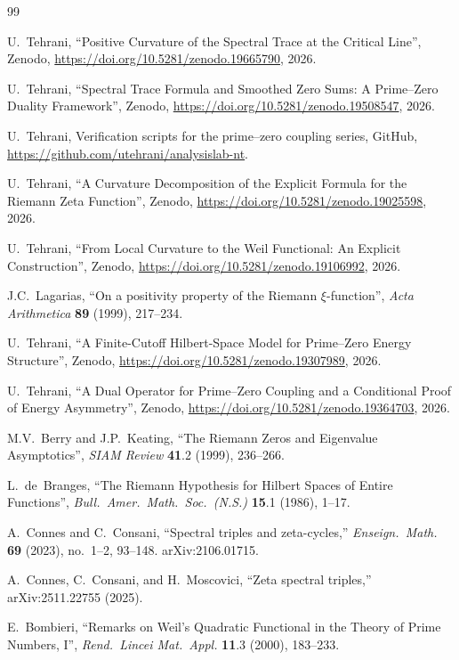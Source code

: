 \documentclass[11pt]{article}
\begin{document}
\newpage
\begin{thebibliography}{99}

U.~Tehrani,
``Positive Curvature of the Spectral Trace at the Critical Line'',
Zenodo, \url{https://doi.org/10.5281/zenodo.19665790}, 2026.

U.~Tehrani,
``Spectral Trace Formula and Smoothed Zero Sums:
A Prime--Zero Duality Framework'',
Zenodo, \url{https://doi.org/10.5281/zenodo.19508547}, 2026.

U.~Tehrani,
Verification scripts for the prime--zero coupling series,
GitHub, \url{https://github.com/utehrani/analysislab-nt}.

U.~Tehrani,
``A Curvature Decomposition of the Explicit Formula
for the Riemann Zeta Function'',
Zenodo, \url{https://doi.org/10.5281/zenodo.19025598}, 2026.

U.~Tehrani,
``From Local Curvature to the Weil Functional:
An Explicit Construction'',
Zenodo, \url{https://doi.org/10.5281/zenodo.19106992}, 2026.

J.C.~Lagarias,
``On a positivity property of the Riemann $\xi$-function'',
\emph{Acta Arithmetica} \textbf{89} (1999), 217--234.

U.~Tehrani,
``A Finite-Cutoff Hilbert-Space Model for Prime--Zero Energy Structure'',
Zenodo, \url{https://doi.org/10.5281/zenodo.19307989}, 2026.

U.~Tehrani,
``A Dual Operator for Prime--Zero Coupling
and a Conditional Proof of Energy Asymmetry'',
Zenodo, \url{https://doi.org/10.5281/zenodo.19364703}, 2026.

M.V.~Berry and J.P.~Keating,
``The Riemann Zeros and Eigenvalue Asymptotics'',
\emph{SIAM Review} \textbf{41}.2 (1999), 236--266.

L.~de~Branges,
``The Riemann Hypothesis for Hilbert Spaces of Entire Functions'',
\emph{Bull.\ Amer.\ Math.\ Soc.\ (N.S.)} \textbf{15}.1 (1986), 1--17.

A.~Connes and C.~Consani,
``Spectral triples and zeta-cycles,''
\textit{Enseign.\ Math.} \textbf{69} (2023), no.~1--2, 93--148.
arXiv:2106.01715.

A.~Connes, C.~Consani, and H.~Moscovici,
``Zeta spectral triples,''
arXiv:2511.22755 (2025).

E.~Bombieri,
``Remarks on Weil's Quadratic Functional in the Theory of Prime
Numbers, I'',
\emph{Rend.\ Lincei Mat.\ Appl.} \textbf{11}.3 (2000), 183--233.


\end{thebibliography}
\end{document}
